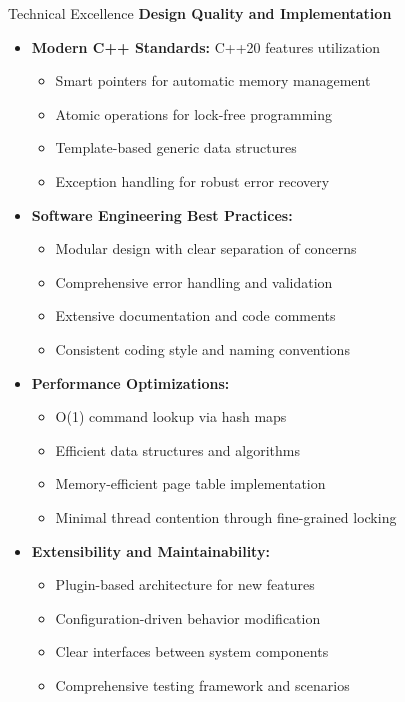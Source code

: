 \documentclass[10pt]{beamer}
\begin{document}
\begin{frame}{Technical Excellence}
    \textbf{Design Quality and Implementation}
    
    \begin{itemize}
        \item \textbf{Modern C++ Standards:} C++20 features utilization
        \begin{itemize}
            \item Smart pointers for automatic memory management
            \item Atomic operations for lock-free programming
            \item Template-based generic data structures
            \item Exception handling for robust error recovery
        \end{itemize}
        
        \item \textbf{Software Engineering Best Practices:}
        \begin{itemize}
            \item Modular design with clear separation of concerns
            \item Comprehensive error handling and validation
            \item Extensive documentation and code comments
            \item Consistent coding style and naming conventions
        \end{itemize}
        
        \item \textbf{Performance Optimizations:}
        \begin{itemize}
            \item O(1) command lookup via hash maps
            \item Efficient data structures and algorithms
            \item Memory-efficient page table implementation
            \item Minimal thread contention through fine-grained locking
        \end{itemize}
        
        \item \textbf{Extensibility and Maintainability:}
        \begin{itemize}
            \item Plugin-based architecture for new features
            \item Configuration-driven behavior modification
            \item Clear interfaces between system components
            \item Comprehensive testing framework and scenarios
        \end{itemize}
    \end{itemize}
\end{frame}
\end{document}
